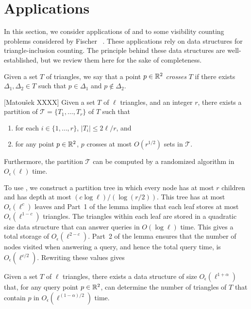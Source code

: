 \documentclass{patmorin}
\newcommand{\Oe}{O_\epsilon}
\begin{document}
\section{Applications}

In this section, we consider applications of  and
 to some visibility counting problems considered by
Fischer \etal\ \cite{fXX}.  These applications rely on data structures for
triangle-inclusion counting.  The principle behind these data structures
are well-established, but we review them here for the sake of completeness.

Given a set $T$ of triangles, we say that a point $p\in\mathbb{R}^2$ \emph{crosses}
$T$ if there exists $\Delta_1,\Delta_2\in T$ such that $p\in\Delta_1$ and
$p\not\in\Delta_2$.

\begin{lem}[Matou\v{s}ek XXXX]
  Given a set $T$ of $\ell$ triangles, and an integer $r$, there exists
  a partition of $\mathcal{T}=\{T_1,\ldots,T_r\}$ of $T$ such that
  \begin{enumerate}
    \item for each $i\in\{1,\ldots,r\}$, $|T_i| \le 2\ell/r$, and
    \item for any point $p\in\mathbb{R}^2$, $p$ crosses at most $O(r^{1/2})$ 
          sets in $\mathcal{T}$.
  \end{enumerate}
  Furthermore, the partition $\mathcal{T}$ can be computed by a randomized
  algorithm in $\Oe(\ell)$ time.
\end{lem}

To use , we construct a partition tree in which every
node has at most  $r$ children and has depth at most $(c \log \ell)/(\log
(r/2))$.  This tree has at most $\Oe(\ell^c)$ leaves and Part~1 of the
lemma implies that each leaf stores at most $\Oe(\ell^{1-c})$ triangles.
The triangles within each leaf are stored in a quadratic size data
structure that can answer queries in $O(\log \ell)$ time.  This gives a
total storage of $\Oe(\ell^{2-c})$.  Part~2 of the lemma ensures that the
number of nodes visited when answering a query, and hence the total query
time, is $\Oe(\ell^{c/2})$.  Rewriting these values gives

\begin{thm}
Given a set $T$ of $\ell$ triangles, there exists a data structure
of size $\Oe(\ell^{1+\alpha})$ that, for any query point $p\in\mathbb{R}^2$,
can determine the number of triangles of $T$ that contain $p$ in
$\Oe(\ell^{(1-\alpha)/2})$ time.
\end{thm}
\end{document}
